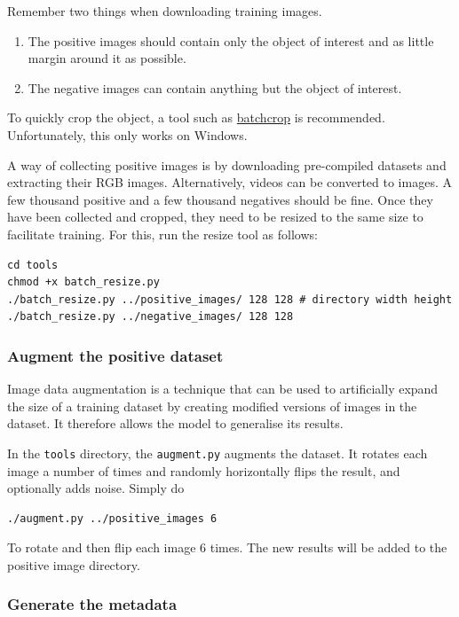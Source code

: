 \documentclass[a4paper]{article}
\begin{document}
Remember two things when downloading training images.
\begin{enumerate}
    \item The positive images should contain only the object of interest and as little margin around it as possible.
    \item The negative images can contain anything but the object of interest.
\end{enumerate}
To quickly crop the object, a tool such as  \href{https://www.batchcrop.com}{batchcrop} is recommended. Unfortunately, this only works on Windows.

A way of collecting positive images is by downloading pre-compiled datasets and extracting their RGB images. Alternatively, videos can be converted to images. A few thousand positive and a few thousand negatives should be fine. Once they have been collected and cropped, they need to be resized to the same size to facilitate training. For this, run the resize tool as follows:
\begin{verbatim}
cd tools
chmod +x batch_resize.py
./batch_resize.py ../positive_images/ 128 128 # directory width height
./batch_resize.py ../negative_images/ 128 128
\end{verbatim}




\subsubsection{Augment the positive dataset}

Image data augmentation is a technique that can be used to artificially expand the size of a training dataset by creating modified versions of images in the dataset. It therefore allows the model to generalise its results.

In the \texttt{tools} directory, the \texttt{augment.py} augments the dataset. It rotates each image a number of times and randomly horizontally flips the result, and optionally adds noise. Simply do
\begin{verbatim}
./augment.py ../positive_images 6
\end{verbatim}
To  rotate and then flip each image 6 times. The new results will be added to the positive image directory.



\subsubsection{Generate the metadata}
\end{document}
